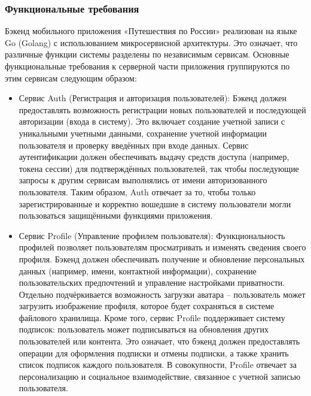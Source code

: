 \subsubsection*{Функциональные требования}
Бэкенд мобильного приложения «Путешествия по России» реализован на языке Go (Golang) с использованием микросервисной архитектуры. Это означает, что различные функции системы разделены по независимым сервисам. Основные функциональные требования к серверной части приложения группируются по этим сервисам следующим образом:
\begin{itemize}
    \item Сервис Auth (Регистрация и авторизация пользователей): Бэкенд должен предоставлять возможность регистрации новых пользователей и последующей авторизации (входа в систему). Это включает создание учетной записи с уникальными учетными данными, сохранение учетной информации пользователя и проверку введённых при входе данных. Сервис аутентификации должен обеспечивать выдачу средств доступа (например, токена сессии) для подтверждённых пользователей, так чтобы последующие запросы к другим сервисам выполнялись от имени авторизованного пользователя. Таким образом, Auth отвечает за то, чтобы только зарегистрированные и корректно вошедшие в систему пользователи могли пользоваться защищёнными функциями приложения.
    \item Сервис Profile (Управление профилем пользователя): Функциональность профилей позволяет пользователям просматривать и изменять сведения своего профиля. Бэкенд должен обеспечивать получение и обновление персональных данных (например, имени, контактной информации), сохранение пользовательских предпочтений и управление настройками приватности. Отдельно подчёркивается возможность загрузки аватара – пользователь может загрузить изображение профиля, которое будет сохраняться в системе файлового хранилища. Кроме того, сервис Profile поддерживает систему подписок: пользователь может подписываться на обновления других пользователей или контента. Это означает, что бэкенд должен предоставлять операции для оформления подписки и отмены подписки, а также хранить список подписок каждого пользователя. В совокупности, Profile отвечает за персонализацию и социальное взаимодействие, связанное с учетной записью пользователя.

\end{itemize}
